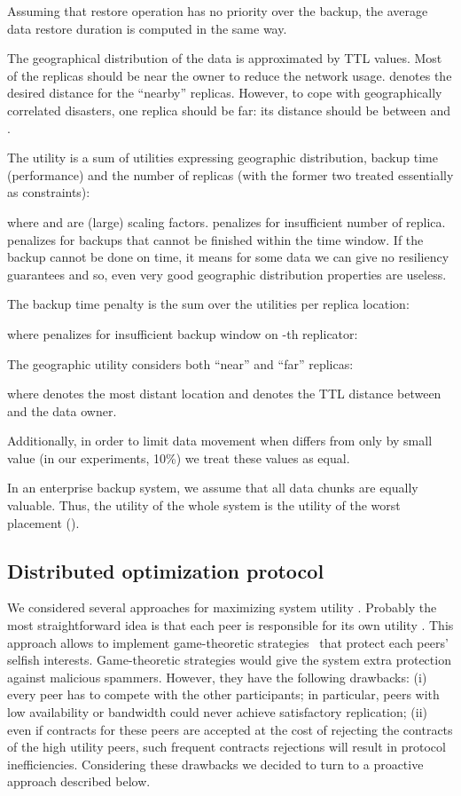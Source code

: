 \documentclass[10pt, final, conference, letterpaper]{IEEEtran}
\begin{document}
Assuming that restore operation has no priority over the backup, the average data restore duration  is computed in the same way.

The geographical distribution of the data is approximated by TTL values. Most of the replicas should be near the owner to reduce the network usage.  denotes the desired distance for the ``nearby'' replicas. However, to cope with geographically correlated disasters, one replica should be far: its distance should be between  and .

The utility is a sum of utilities expressing geographic distribution, backup time (performance) and the number of replicas (with the former two treated essentially as constraints):

where  and  are (large) scaling factors.  penalizes for insufficient number of replica.  penalizes for backups that cannot be finished within the time window. If the backup cannot be done on time, it means for some data we can give no resiliency guarantees and so, even very good geographic distribution properties are useless.

The backup time penalty  is the sum over the utilities per replica location:

where  penalizes for insufficient backup window on -th replicator:


The geographic utility  considers both ``near'' and ``far'' replicas:

where  denotes the most distant location and  denotes the TTL distance between  and the data owner. 

Additionally, in order to limit data movement when  differs from  only by small value (in our experiments, 10\%) we treat these values as equal.

In an enterprise backup system, we assume that all data chunks are equally valuable. Thus, the utility of the whole system is the utility of the worst placement ().





\subsection{Distributed optimization protocol}

We considered several approaches for maximizing system utility . Probably the most straightforward idea is that each peer is responsible for its own utility . This approach allows to implement game-theoretic strategies~\cite{Rzadca2010ReplicaPlacementin, cox2003samsara} that protect each peers' selfish interests. Game-theoretic strategies would give the system extra protection against malicious spammers. However, they have the following drawbacks: (i) every peer has to compete with the other participants; in particular, peers with low availability or bandwidth could never achieve satisfactory replication; (ii) even if contracts for these  peers are accepted at the cost of rejecting the contracts of the high utility peers, such frequent contracts rejections will result in protocol inefficiencies. Considering these drawbacks we decided to turn to a proactive approach described below.
\end{document}
